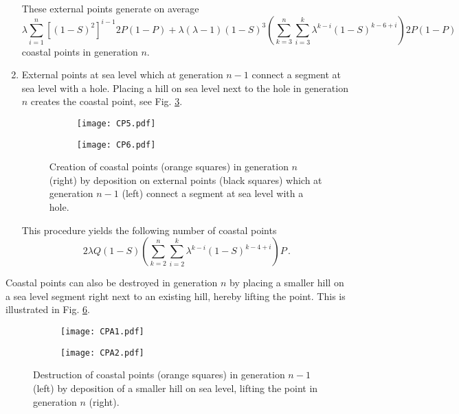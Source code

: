 \documentclass[amsmath,amssymb,amsfonts,aps,pre,preprint,superscriptaddress,bibnotes,showpacs,showkeys,longbibliography,nofootinbib]{revtex4-1}
\begin{document}
\begin{enumerate}
    These external points generate on average \begin{equation}
        \label{eq:coastal_B}
        \lambda \sum\limits_{i=1}^n \left[(1-S)^2\right]^{i-1} 2P(1-P) + \lambda (\lambda-1)(1-S)^3 \left(\sum\limits_{k=3}^n \sum\limits_{i=3}^k \lambda^{k-i} (1-S)^{k-6+i}\right)2P(1-P)
    \end{equation}
    coastal points in generation $n$. 
    \item External points at sea level which at generation $n-1$ connect a segment at sea level with a hole. Placing a hill on sea level next to the hole in generation $n$ creates the coastal point, see Fig. \ref{fig:CP56}.
    \begin{figure}[h]
        \centering
            \begin{subfigure}[b]{0.4\textwidth}
                 \centering
                 \texttt{[image: CP5.pdf]}
                 \label{fig:CP5}
            \end{subfigure}\hspace{2cm}
            \begin{subfigure}[b]{0.4\textwidth}
                 \centering
                 \texttt{[image: CP6.pdf]}
                 \label{fig:CP6}
            \end{subfigure}
            \caption{Creation of coastal points (orange squares) in generation $n$ (right) by deposition on external points (black squares) which at generation $n-1$ (left) connect a segment at sea level with a hole. }
            \label{fig:CP56}
    \end{figure}
    This procedure yields the following number of coastal points
    \begin{equation}
        \label{eq:coastal_C}
         2 \lambda Q (1-S)\left(\sum\limits_{k=2}^n \sum\limits_{i=2}^k \lambda^{k-i} (1-S)^{k-4+i}\right)P\, .
    \end{equation}
\end{enumerate}
Coastal points can also be destroyed in generation $n$ by placing a smaller hill on a sea level segment right next to an existing hill, hereby lifting the point. This is illustrated in Fig. \ref{fig:CPA}.
\begin{figure}[h]
        \centering
            \begin{subfigure}[b]{0.4\textwidth}
                 \centering
                 \texttt{[image: CPA1.pdf]}
                 \label{fig:CPA1}
            \end{subfigure}\hspace{2cm}
            \begin{subfigure}[b]{0.4\textwidth}
                 \centering
                 \texttt{[image: CPA2.pdf]}
                 \label{fig:CPA2}
            \end{subfigure}
            \caption{Destruction of coastal points (orange squares) in generation $n-1$ (left) by deposition of a smaller hill on sea level, lifting the point in generation $n$ (right).}
            \label{fig:CPA}
    \end{figure}
\end{document}
